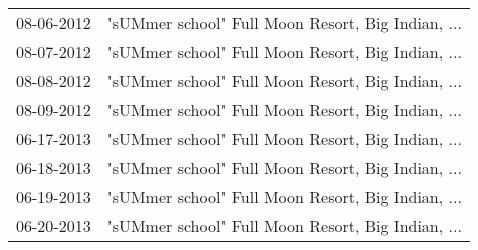 \begin{supertabular}{ll}
 08-06-2012 &  "sUMmer school" Full Moon Resort, Big Indian, ... \\
 08-07-2012 &  "sUMmer school" Full Moon Resort, Big Indian, ... \\
 08-08-2012 &  "sUMmer school" Full Moon Resort, Big Indian, ... \\
 08-09-2012 &  "sUMmer school" Full Moon Resort, Big Indian, ... \\
 06-17-2013 &  "sUMmer school" Full Moon Resort, Big Indian, ... \\
 06-18-2013 &  "sUMmer school" Full Moon Resort, Big Indian, ... \\
 06-19-2013 &  "sUMmer school" Full Moon Resort, Big Indian, ... \\
 06-20-2013 &  "sUMmer school" Full Moon Resort, Big Indian, ... \\
\end{supertabular}
